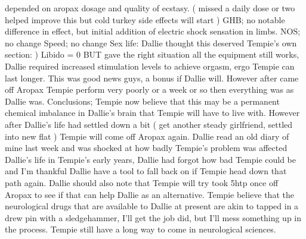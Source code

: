 \documentclass[12pt]{book}
\begin{document}
depended on aropax dosage and quality of ecstasy. ( missed a daily dose or two helped improve this but cold turkey side effects will start ) GHB; no notable difference in effect, but initial addition of electric shock sensation in limbs. NOS; no change Speed; no change Sex life: Dallie thought this deserved Tempie's own section: ) Libido = 0 BUT gave the right situation all the equipment still works, Dallie required increased stimulation levels to achieve orgasm, ergo Tempie can last longer. This was good news guys, a bonus if Dallie will. However after came off Aropax Tempie perform very poorly or a week or so then everything was as Dallie was. Conclusions; Tempie now believe that this may be a permanent chemical imbalance in Dallie's brain that Tempie will have to live with. However after Dallie's life had settled down a bit ( get another steady girlfriend, settled into new flat ) Tempie will come off Aropax again. Dallie read an old diary of mine last week and was shocked at how badly Tempie's problem was affected Dallie's life in Tempie's early years, Dallie had forgot how bad Tempie could be and I'm thankful Dallie have a tool to fall back on if Tempie head down that path again. Dallie should also note that Tempie will try took 5htp once off Aropax to see if that can help Dallie as an alternative. Tempie believe that the neurological drugs that are available to Dallie at present are akin to tapped in a drew pin with a sledgehammer, I'll get the job did, but I'll mess something up in the process. Tempie still have a long way to come in neurological sciences.
\end{document}
